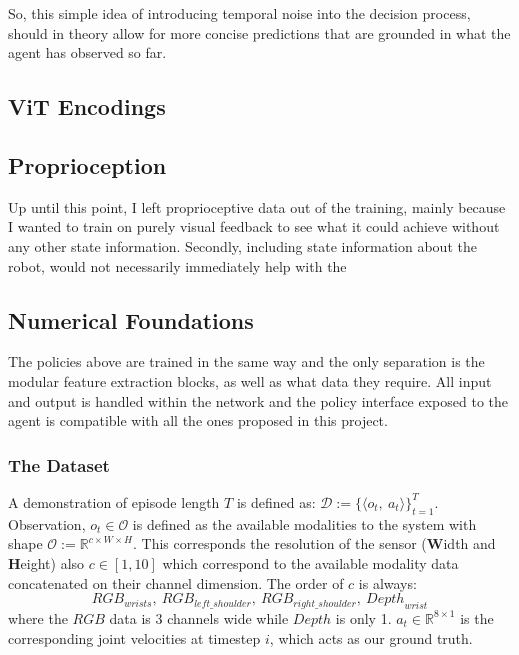 So, this simple idea of introducing temporal noise into the decision process, should in theory allow for more concise predictions that are grounded in what the agent has observed so far.

\subsection{ViT Encodings}



\subsection{Proprioception}
Up until this point, I left proprioceptive data out of the training, mainly because I wanted to train on purely visual feedback to see what it could achieve without any other state information. Secondly, including state information about the robot, would not necessarily immediately help with the 

\subsection{Numerical Foundations}

The policies above are trained in the same way and the only separation is the modular feature extraction blocks, as well as what data they require. All input and output is handled within the network and the policy interface exposed to the agent is compatible with all the ones proposed in this project.

\subsubsection{The Dataset}
A demonstration of episode length $T$ is defined as: \(\mathcal{D} := \{\langle o_t, ~a_t\rangle\}_{t = 1}^{T} \). Observation, \(o_t \in \mathcal{O}\) is defined as the available modalities to the system with shape \(\mathcal{O} := \mathbb{R}^{c \times W \times H}\). This corresponds the resolution of the sensor (\textbf{W}idth and \textbf{H}eight) also $c \in \left[1, 10\right]$ which correspond to the available modality data concatenated on their channel dimension. The order of $c$ is always:
\[
{RGB}_{wrists}, ~{RGB}_{{left}\_{shoulder}}, ~{RGB}_{{right}\_{shoulder}}, ~{Depth}_{wrist}
\] 
where the $RGB$ data is $3$ channels wide while $Depth$ is only 1. \(a_t \in \mathbb{R}^{8 \times 1}\) is the corresponding joint velocities at timestep $i$, which acts as our ground truth. 

